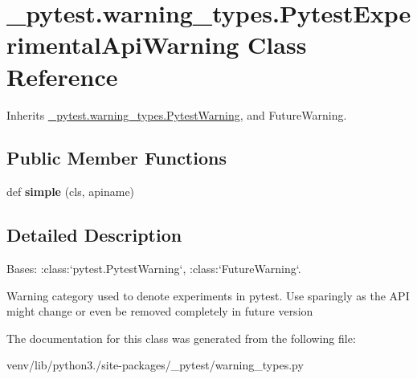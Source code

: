 \hypertarget{class__pytest_1_1warning__types_1_1_pytest_experimental_api_warning}{}\section{\+\_\+pytest.\+warning\+\_\+types.\+Pytest\+Experimental\+Api\+Warning Class Reference}
\label{class__pytest_1_1warning__types_1_1_pytest_experimental_api_warning}


Inherits \hyperlink{class__pytest_1_1warning__types_1_1_pytest_warning}{\+\_\+pytest.\+warning\+\_\+types.\+Pytest\+Warning}, and Future\+Warning.

\subsection*{Public Member Functions}
\begin{DoxyCompactItemize}
\item 
\mbox{\label{class__pytest_1_1warning__types_1_1_pytest_experimental_api_warning_a513876a6d9cef7cb5af82899777db432}} 
def {\bfseries simple} (cls, apiname)
\end{DoxyCompactItemize}


\subsection{Detailed Description}
\begin{DoxyVerb}Bases: :class:`pytest.PytestWarning`, :class:`FutureWarning`.

Warning category used to denote experiments in pytest. Use sparingly as the API might change or even be
removed completely in future version
\end{DoxyVerb}
 

The documentation for this class was generated from the following file\+:\begin{DoxyCompactItemize}
\item 
venv/lib/python3./site-\/packages/\+\_\+pytest/warning\+\_\+types.\+py\end{DoxyCompactItemize}
